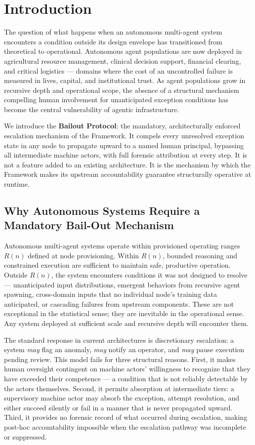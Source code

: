 \section{Introduction}

The question of what happens when an autonomous multi-agent system encounters a condition outside its design envelope has transitioned from theoretical to operational. Autonomous agent populations are now deployed in agricultural resource management, clinical decision support, financial clearing, and critical logistics --- domains where the cost of an uncontrolled failure is measured in lives, capital, and institutional trust. As agent populations grow in recursive depth and operational scope, the absence of a structural mechanism compelling human involvement for unanticipated exception conditions has become the central vulnerability of agentic infrastructure.

We introduce the \textbf{Bailout Protocol}: the mandatory, architecturally enforced escalation mechanism of the \bxthree{} Framework. It compels every unresolved exception state in any \bxthree{} node to propagate upward to a named human principal, bypassing all intermediate machine actors, with full forensic attribution at every step. It is not a feature added to an existing architecture. It is the mechanism by which the \bxthree{} Framework makes its upstream accountability guarantee structurally operative at runtime.

\subsection{Why Autonomous Systems Require a Mandatory Bail-Out Mechanism}

Autonomous multi-agent systems operate within provisioned operating ranges $R(n)$ defined at node provisioning. Within $R(n)$, bounded reasoning and constrained execution are sufficient to maintain safe, productive operation. Outside $R(n)$, the system encounters conditions it was not designed to resolve --- unanticipated input distributions, emergent behaviors from recursive agent spawning, cross-domain inputs that no individual node's training data anticipated, or cascading failures from upstream components. These are not exceptional in the statistical sense; they are inevitable in the operational sense. Any system deployed at sufficient scale and recursive depth will encounter them.

The standard response in current architectures is discretionary escalation: a system \emph{may} flag an anomaly, \emph{may} notify an operator, and \emph{may} pause execution pending review. This model fails for three structural reasons. First, it makes human oversight contingent on machine actors' willingness to recognize that they have exceeded their competence --- a condition that is not reliably detectable by the actors themselves. Second, it permits absorption at intermediate tiers: a supervisory machine actor may absorb the exception, attempt resolution, and either succeed silently or fail in a manner that is never propagated upward. Third, it provides no forensic record of what occurred during escalation, making post-hoc accountability impossible when the escalation pathway was incomplete or suppressed.


